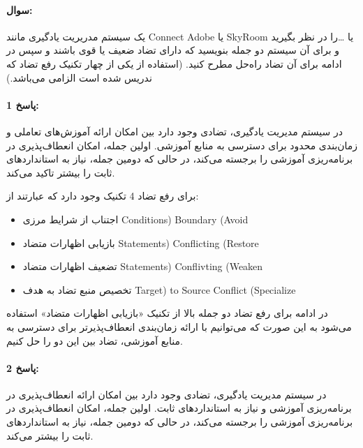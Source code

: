\documentclass[a4paper,10pt]{article}
\begin{document}
    \paragraph{سوال:} یک سیستم مدریریت یادگیری مانند Connect Adobe یا SkyRoom یا \dots را در نظر بگیرید و برای آن سیستم دو جمله بنویسید که دارای تضاد ضعیف یا قوی باشند و سپس در ادامه برای آن تضاد راه‌حل مطرح کنید. (استفاده از یکی از چهار تکنیک رفع تضاد که ندریس شده است الزامی می‌باشد.)

    \paragraph{پاسخ 1:} در سیستم مدیریت یادگیری، تضادی وجود دارد بین امکان ارائه آموزش‌های تعاملی و زمان‌بندی محدود برای دسترسی به منابع آموزشی. اولین جمله، امکان انعطاف‌پذیری در برنامه‌ریزی آموزشی را برجسته می‌کند، در حالی که دومین جمله، نیاز به استانداردهای ثابت را بیشتر تاکید می‌کند.

    برای رفع تضاد 4 تکنیک وجود دارد که عبارتند از:

    \begin{itemize}
        
        \item اجتناب از شرایط مرزی Conditions) Boundary (Avoid

        \item بازیابی اظهارات متضاد Statements) Conflicting (Restore

        \item تضعیف اظهارات متضاد Statements) Conflivting (Weaken

        \item تخصیص منبع تضاد به هدف Target) to Source Conflict (Specialize

    \end{itemize}

    در ادامه برای رفع تضاد دو جمله بالا از تکنیک «بازیابی اظهارات متضاد» استفاده می‌شود به این صورت که می‌توانیم با ارائه زمان‌بندی انعطاف‌پذیرتر برای دسترسی به منابع آموزشی، تضاد بین این دو را حل کنیم.

    \noindent\hrulefill

    \paragraph{پاسخ 2:} در سیستم مدیریت یادگیری، تضادی وجود دارد بین امکان ارائه انعطاف‌پذیری در برنامه‌ریزی آموزشی و نیاز به استانداردهای ثابت. اولین جمله، امکان انعطاف‌پذیری در برنامه‌ریزی آموزشی را برجسته می‌کند، در حالی که دومین جمله، نیاز به استانداردهای ثابت را بیشتر می‌کند.
\end{document}
